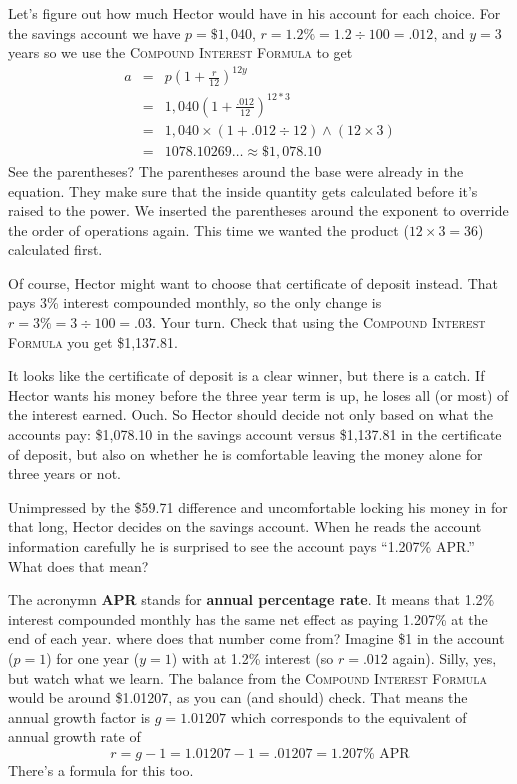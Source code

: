 Let's figure out how much Hector would have in his account for each choice.  For the savings account we have $p=\$1,040$, $r=1.2\% = 1.2 \div 100 = .012$, and $y = 3$ years so we use the \textsc{Compound Interest Formula} to get
\begin{eqnarray*}
a & = &  p \left( 1 + \frac{r}{12}\right) ^{12y}\\
& = &   1,040 \left( 1 + \frac{.012}{12}\right) ^{12\ast 3}\\
& =  &  1,040 \times ( 1 + .012 \div 12 ) \wedge (12 \times 3) \\
& =  & 1078.10269\ldots  \approx \$1,078.10 
\end{eqnarray*}
See the parentheses?  The parentheses around the base were already in the equation.  They make sure that the inside quantity gets calculated before it's raised to the power.  We inserted the parentheses around the exponent to override the order of operations again.  This time we wanted the product ($12 \times 3=36$) calculated first.  

Of course, Hector might want to choose that certificate of deposit instead.  That pays 3\% interest compounded monthly, so the only change is  $r=3\% = 3 \div 100 = .03$.  Your turn.  Check that using the \textsc{Compound Interest Formula} you get \$1,137.81.

It looks like the certificate of deposit is a clear winner, but there is a catch.  If Hector wants his money before the three year term is up, he loses all (or most) of the interest earned. Ouch.  So Hector should decide not only based on what the accounts pay: \$1,078.10 in the savings account versus \$1,137.81 in the certificate of deposit, but also on whether he is comfortable leaving the money alone for three years or not.

Unimpressed by the \$59.71 difference and uncomfortable locking his money in for that long, Hector decides on the savings account. When he reads the account information carefully he is surprised to see the account pays ``1.207\% APR.''  What does that mean?

The acronymn \textbf{APR} stands for \textbf{annual percentage rate}.  It means that 1.2\% interest compounded monthly has the same net effect as paying 1.207\% at the end of each year.  where does that number come from?  Imagine \$1 in the account  ($p=1$) for one year ($y=1$) with at 1.2\% interest (so $r=.012$ again).  Silly, yes, but watch what we learn.  
The balance from the \textsc{Compound Interest Formula} would be around \$1.01207, as you can (and should) check.
That means the annual growth factor is $g=1.01207$ which corresponds to the equivalent of annual growth rate of $$r=g-1=1.01207-1 = .01207 = 1.207\% \text{ APR}$$  There's a formula for this too.

